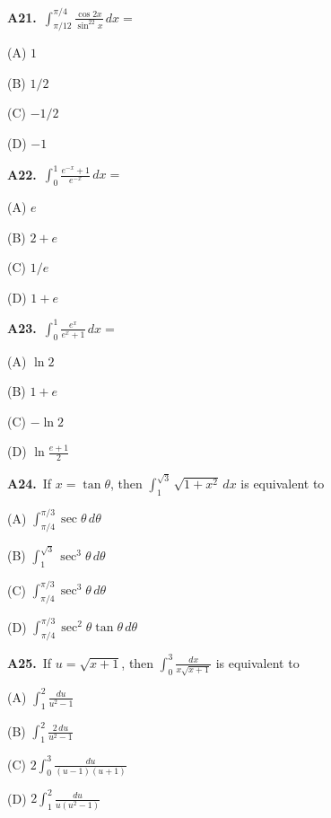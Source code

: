 \documentclass[11pt]{article}
\begin{document}
\bigskip\noindent\textbf{A21.}\ $\int_{\pi/12}^{\pi/4}\frac{\cos2x}{\sin^22x}\,dx=$
\begin{list}{}{\setlength{\leftmargin}{3em}\setlength{\labelwidth}{2.5em}\setlength{\itemsep}{0pt}\setlength{\topsep}{2pt}}
\item[(A)] $1$
\item[(B)] $1/2$
\item[(C)] $-1/2$
\item[(D)] $-1$
\end{list}

\bigskip\noindent\textbf{A22.}\ $\int_0^1\frac{e^{-x}+1}{e^{-x}}\,dx=$
\begin{list}{}{\setlength{\leftmargin}{3em}\setlength{\labelwidth}{2.5em}\setlength{\itemsep}{0pt}\setlength{\topsep}{2pt}}
\item[(A)] $e$
\item[(B)] $2+e$
\item[(C)] $1/e$
\item[(D)] $1+e$
\end{list}

\bigskip\noindent\textbf{A23.}\ $\int_0^1\frac{e^x}{e^x+1}\,dx=$
\begin{list}{}{\setlength{\leftmargin}{3em}\setlength{\labelwidth}{2.5em}\setlength{\itemsep}{0pt}\setlength{\topsep}{2pt}}
\item[(A)] $\ln2$
\item[(B)] $1+e$
\item[(C)] $-\ln2$
\item[(D)] $\ln\frac{e+1}{2}$
\end{list}

\bigskip\noindent\textbf{A24.}\ If $x=\tan\theta$, then $\int_1^{\sqrt3}\sqrt{1+x^2}\,dx$ is equivalent to
\begin{list}{}{\setlength{\leftmargin}{3em}\setlength{\labelwidth}{2.5em}\setlength{\itemsep}{0pt}\setlength{\topsep}{2pt}}
\item[(A)] $\int_{\pi/4}^{\pi/3}\sec\theta\,d\theta$
\item[(B)] $\int_1^{\sqrt3}\sec^3\theta\,d\theta$
\item[(C)] $\int_{\pi/4}^{\pi/3}\sec^3\theta\,d\theta$
\item[(D)] $\int_{\pi/4}^{\pi/3}\sec^2\theta\tan\theta\,d\theta$
\end{list}

\bigskip\noindent\textbf{A25.}\ If $u=\sqrt{x+1}$, then $\int_0^3\frac{dx}{x\sqrt{x+1}}$ is equivalent to
\begin{list}{}{\setlength{\leftmargin}{3em}\setlength{\labelwidth}{2.5em}\setlength{\itemsep}{0pt}\setlength{\topsep}{2pt}}
\item[(A)] $\int_1^2\frac{du}{u^2-1}$
\item[(B)] $\int_1^2\frac{2\,du}{u^2-1}$
\item[(C)] $2\int_0^3\frac{du}{(u-1)(u+1)}$
\item[(D)] $2\int_1^2\frac{du}{u(u^2-1)}$
\end{list}
\end{document}
